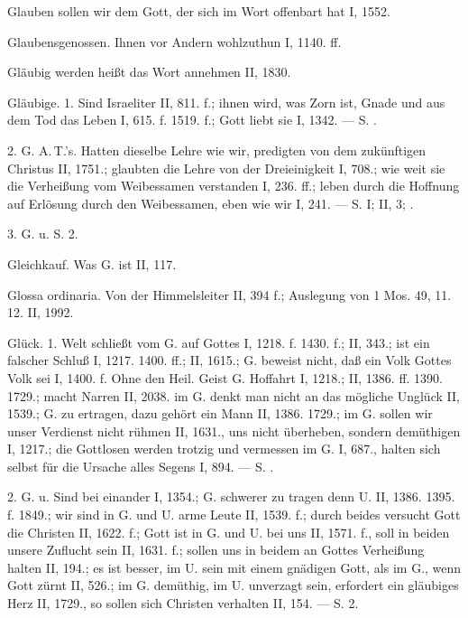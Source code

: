 Glauben sollen wir dem Gott, der sich im Wort offenbart hat I, 1552.

Glaubensgenossen. Ihnen vor Andern wohlzuthun I, 1140. ff.

Gläubig werden heißt das Wort annehmen II, 1830.

Gläubige. 1.  Sind Israeliter II, 811. f.; ihnen wird, was Zorn ist, Gnade und aus dem Tod das Leben I, 615. f. 1519. f.; Gott liebt sie I, 1342. — S. .

2. G.  A.\,T.’s. Hatten dieselbe Lehre wie wir, predigten von dem zukünftigen Christus II, 1751.; glaubten die Lehre von der Dreieinigkeit I, 708.; wie weit sie die Verheißung vom Weibessamen verstanden I, 236. ff.; leben durch die Hoffnung auf Erlösung durch den Weibessamen, eben wie wir I, 241. — S.  I; II, 3; .

3. G. u.  S.  2.

Gleichkauf. Was G. ist II, 117.

Glossa ordinaria. Von der Himmelsleiter II, 394 f.; Auslegung von 1 Mos. 49, 11. 12. II, 1992.

Glück. 1.  Welt schließt vom G. auf Gottes  I, 1218. f. 1430. f.; II, 343.; ist ein falscher Schluß I, 1217. 1400. ff.; II, 1615.; G. beweist nicht, daß ein Volk Gottes Volk sei I, 1400. f. Ohne den Heil. Geist  G. Hoffahrt I, 1218.; II, 1386. ff. 1390. 1729.; macht Narren II, 2038.  im G. denkt man nicht an das mögliche Unglück II, 1539.; G. zu ertragen, dazu gehört ein Mann II, 1386. 1729.; im G. sollen wir unser Verdienst nicht rühmen II, 1631., uns nicht überheben, sondern demüthigen I, 1217.; die Gottlosen
werden trotzig und vermessen im G. I, 687., halten sich selbst für die Ursache alles Segens I, 894. — S. .

2. G. u.  Sind bei einander I, 1354.; G. schwerer zu tragen denn U. II, 1386. 1395. f. 1849.; wir sind in G. und U. arme Leute II, 1539. f.; durch beides versucht Gott die Christen II, 1622. f.; Gott ist in G. und U. bei uns II, 1571. f., soll in beiden unsere Zuflucht sein II, 1631. f.; sollen uns in beidem an Gottes Verheißung halten II, 194.; es ist besser, im U. sein mit einem gnädigen Gott, als im G., wenn Gott zürnt II, 526.; im G. demüthig, im U. unverzagt sein, erfordert ein gläubiges Herz II, 1729., so sollen sich Christen verhalten II, 154. — S.  2.

